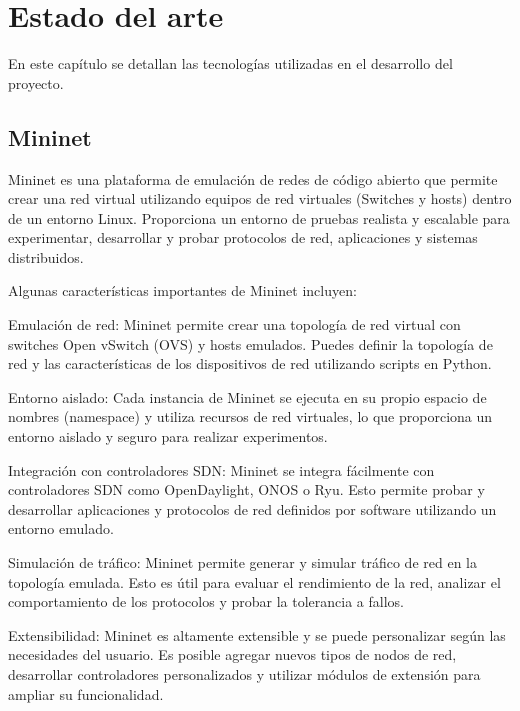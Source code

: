 \documentclass[a4paper, 12pt]{book}
\begin{document}
	
	
	\cleardoublepage
	\chapter{Estado del arte}
	\label{chap:estado}
	
	En este capítulo se detallan las tecnologías utilizadas en el desarrollo del proyecto.	
	
	\section{Mininet} 
	\label{sec:mininet}
	
	Mininet es una plataforma de emulación de redes de código abierto que permite crear una red virtual utilizando equipos de red virtuales (Switches y hosts) dentro de un entorno Linux. Proporciona un entorno de pruebas realista y escalable para experimentar, desarrollar y probar protocolos de red, aplicaciones y sistemas distribuidos.
	
	Algunas características importantes de Mininet incluyen:
	
	Emulación de red: Mininet permite crear una topología de red virtual con switches Open vSwitch (OVS) y hosts emulados. Puedes definir la topología de red y las características de los dispositivos de red utilizando scripts en Python.
	
	Entorno aislado: Cada instancia de Mininet se ejecuta en su propio espacio de nombres (namespace) y utiliza recursos de red virtuales, lo que proporciona un entorno aislado y seguro para realizar experimentos.
	
	Integración con controladores SDN: Mininet se integra fácilmente con controladores SDN como OpenDaylight, ONOS o Ryu. Esto permite probar y desarrollar aplicaciones y protocolos de red definidos por software utilizando un entorno emulado.
	
	Simulación de tráfico: Mininet permite generar y simular tráfico de red en la topología emulada. Esto es útil para evaluar el rendimiento de la red, analizar el comportamiento de los protocolos y probar la tolerancia a fallos.
	
	Extensibilidad: Mininet es altamente extensible y se puede personalizar según las necesidades del usuario. Es posible agregar nuevos tipos de nodos de red, desarrollar controladores personalizados y utilizar módulos de extensión para ampliar su funcionalidad.
	
\end{document}

